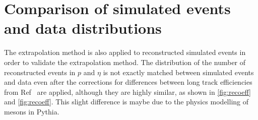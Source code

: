 
\section{Comparison of simulated events and data distributions}
\label{sec:simcal}
The extrapolation method is also applied to reconstructed simulated events in order to validate the extrapolation method. The distribution of the number of reconstructed events in $p$ and $\eta$ is not exactly matched between simulated events and data even after the corrections for differences between long track efficiencies from Ref~\cite{LHCB-DP-2013-002} are applied, although they are highly similar, as shown in \autoref{fig:recoeff}\protect{} and \autoref{fig:recoeff}\protect{}.  This slight difference is maybe due to the physics modelling of \KS mesons in Pythia. %

